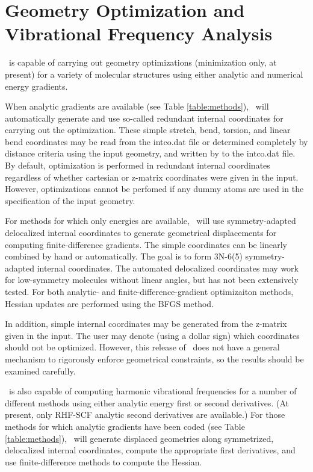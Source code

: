 \section{Geometry Optimization and Vibrational Frequency Analysis} \label{opt}

\PSIthree\ is capable of carrying out geometry optimizations (minimization
only, at present) for a variety of molecular structures using either analytic
and numerical energy gradients.  

When analytic gradients are available (see Table \ref{table:methods}),
\PSIthree\ will automatically generate and use so-called redundant internal
coordinates for carrying out the optimization.  These simple stretch, bend,
torsion, and linear bend coordinates may be read from the intco.dat file
or determined completely by distance criteria using the input geometry, and
written by to the intco.dat file.  By default, optimization is performed in
redundant internal coordinates regardless of whether cartesian or z-matrix
coordinates were given in the input.  However, optimizations cannot be
perfomed if any dummy atoms are used in the specification of the input
geometry.  

For methods for which only energies are available, \PSIthree\ will use
symmetry-adapted delocalized internal coordinates to generate geometrical
displacements for computing finite-difference gradients. The simple
coordinates can be linearly combined by hand or automatically.  The goal
is to form 3N-6(5) symmetry-adapted internal coordinates.  The automated
delocalized coordinates may work for low-symmetry molecules without
linear angles, but has not been extensively tested.  For both analytic-
and finite-difference-gradient optimizaiton methods, Hessian updates are
performed using the BFGS method.

In addition, simple internal coordinates may be generated from the z-matrix
given in the input.  The user may denote (using a dollar sign) which
coordinates should not be optimized.  However, this release of \PSIthree\
does not have a general mechanism to rigorously enforce geometrical
constraints, so the results should be examined carefully.

\PSIthree\ is also capable of computing harmonic vibrational frequencies
for a number of different methods using either analytic energy first or
second derivatives.  (At present, only RHF-SCF analytic second derivatives
are available.)  For those methods for which analytic gradients have been
coded (see Table \ref{table:methods}), \PSIthree\ will generate displaced
geometries along symmetrized, delocalized internal coordinates, compute
the appropriate first derivatives, and use finite-difference methods to
compute the Hessian.


